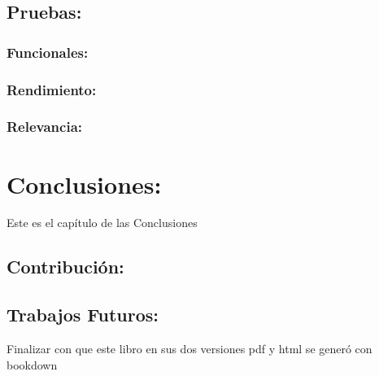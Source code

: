 \documentclass[
  10,
  openany]{book}
\begin{document}
\hypertarget{pruebas}{%
\section{Pruebas:}\label{pruebas}}

\hypertarget{pruebas1}{%
\subsection{Funcionales:}\label{pruebas1}}

\hypertarget{pruebas2}{%
\subsection{Rendimiento:}\label{pruebas2}}

\hypertarget{pruebas3}{%
\subsection{Relevancia:}\label{pruebas3}}

\hypertarget{conclusiones}{%
\chapter{Conclusiones:}\label{conclusiones}}

Este es el capítulo de las Conclusiones

\hypertarget{conclusionescontri}{%
\section{Contribución:}\label{conclusionescontri}}

\hypertarget{conclusionestrabafutu}{%
\section{Trabajos Futuros:}\label{conclusionestrabafutu}}

Finalizar con que este libro en sus dos versiones pdf y html se generó con bookdown

  
\end{document}
